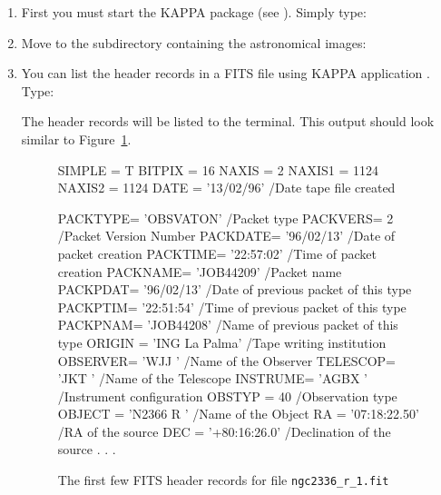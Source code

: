 \documentclass[twoside,11pt]{starlink}
\begin{document}
\begin{enumerate}

  \item First you must start the KAPPA package (see
   \/\cite{SUN95}).  Simply type:

\begin{terminalv}
\end{terminalv}

  \item Move to the subdirectory containing the astronomical images:

\begin{terminalv}
\end{terminalv}

  \item You can list the header records in a FITS file using KAPPA
   application .  Type:

\begin{terminalv}
\end{terminalv}

   The header records will be listed to the terminal.  This output should
   look similar to Figure~\ref{FITSKEYS}.

  \begin{figure}[htbp]

\begin{small}
\begin{terminalv}
SIMPLE  =                    T
BITPIX  =                   16
NAXIS   =                    2
NAXIS1  =                 1124
NAXIS2  =                 1124
DATE    = '13/02/96'                    /Date tape file created

PACKTYPE= 'OBSVATON'                    /Packet type
PACKVERS=                    2          /Packet Version Number
PACKDATE= '96/02/13'                    /Date of packet creation
PACKTIME= '22:57:02'                    /Time of packet creation
PACKNAME= 'JOB44209'                    /Packet name
PACKPDAT= '96/02/13'                    /Date of previous packet of this type
PACKPTIM= '22:51:54'                    /Time of previous packet of this type
PACKPNAM= 'JOB44208'                    /Name of previous packet of this type
ORIGIN  = 'ING La Palma'                /Tape writing institution
OBSERVER= 'WJJ     '                    /Name of the Observer
TELESCOP= 'JKT     '                    /Name of the Telescope
INSTRUME= 'AGBX    '                    /Instrument configuration
OBSTYP  =                   40          /Observation type
OBJECT  = 'N2366 R '                    /Name of the Object
RA      = '07:18:22.50'                 /RA of the source
DEC     = '+80:16:26.0'                 /Declination of the source
        .
        .
        .
\end{terminalv}
\end{small}
  \begin{quote}
  \caption{The first few FITS header records for file \texttt{ngc2336\_r\_1.fit}
  \label{FITSKEYS} }
  \end{quote}


\end{figure}
\end{enumerate}
\end{document}
